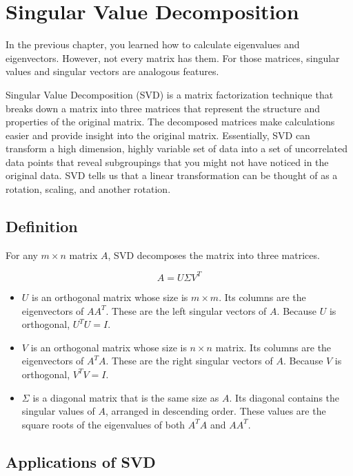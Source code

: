 \chapter{Singular Value Decomposition}

In the previous chapter, you learned how to calculate eigenvalues and eigenvectors. However, not every matrix has them. For those matrices, singular values and singular vectors are analogous features. 

Singular Value Decomposition (SVD) is a matrix factorization technique that breaks down a matrix into three matrices that represent the structure and properties of the original matrix. The decomposed matrices make calculations easier and provide insight into the original matrix. Essentially, SVD can transform a high dimension, highly variable set of data into a set of uncorrelated data points that reveal subgroupings that you might not have noticed in the original data. SVD tells us that a linear transformation can be thought of as a rotation, scaling, and another rotation.
 

\section{Definition}
For any $m \times n$ matrix $A$, SVD decomposes the matrix into three matrices.

\begin{equation}
A = U \Sigma V^T
\end{equation}

\begin{itemize}
\item $U$ is an orthogonal matrix whose size is $m \times m$. Its columns are the eigenvectors of $AA^T$. These are the left singular vectors of $A$. Because $U$ is orthogonal, $U^TU = I$.
\item $V$ is an orthogonal matrix whose size is $n \times n$ matrix. Its columns are the eigenvectors of $A^TA$. These are the right singular vectors of $A$. Because $V$ is orthogonal, $V^TV = I$.
\item  $\Sigma$ is a diagonal matrix that is the same size as $A$. Its diagonal contains the singular values of $A$, arranged in descending order. These values are the square roots of the eigenvalues of both $A^TA$ and $AA^T$. 
\end{itemize}

\section{Applications of SVD}

